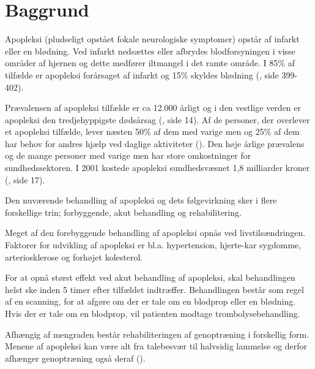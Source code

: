 \chapter{Baggrund} \label{chap:Baggrund}

Apopleksi (pludseligt opstået fokale neurologiske symptomer) opstår af infarkt eller en blødning. Ved infarkt nedsættes eller afbrydes blodforsyningen i visse områder af hjernen og dette medfører iltmangel i det ramte område. I 85\% af tilfælde er apopleksi forårsaget af infarkt og 15\% skyldes blødning (\cite{RefWorks:32}, side 399-402).

Prævalensen af apopleksi tilfælde er ca 12.000 årligt og i den vestlige verden er apopleksi den tredjehyppigste dødsårsag (\cite{RefWorks:21}, side 14). Af de personer, der overlever et apopleksi tilfælde, lever næsten 50\% af dem med varige men og 25\% af dem har behov for andres hjælp ved daglige aktiviteter (\cite{RefWorks:33}). Den høje årlige prævalens og de mange personer med varige men har store omkostninger for sundhedssektoren.  I 2001 kostede apopleksi sundhedsvæsnet 1,8 milliarder kroner (\cite{RefWorks:37}, side 17). 

Den nuværende behandling af apopleksi og dets følgevirkning sker i flere forskellige trin; forbyggende, akut behandling og rehabilitering. 

Meget af den forebyggende behandling af apopleksi opnås ved livstilsændringen. Faktorer for udvikling af apopleksi er bl.a. hypertension, hjerte-kar sygdomme, arteriosklerose og forhøjet kolesterol. 

For at opnå størst effekt ved akut behandling af apopleksi, skal behandlingen helst ske inden 5 timer efter tilfældet indtræffer. Behandlingen består som regel af en scanning, for at afgøre om der er tale om en blodprop eller en blødning. Hvis der er tale om en blodprop, vil patienten modtage trombolysebehandling.

Afhængig af mengraden består rehabiliteringen af genoptræning i forskellig form. Menene af apopleksi kan være alt fra talebesvær til halvsidig lammelse og derfor afhænger genoptræning også deraf (\cite{RefWorks:34}).

